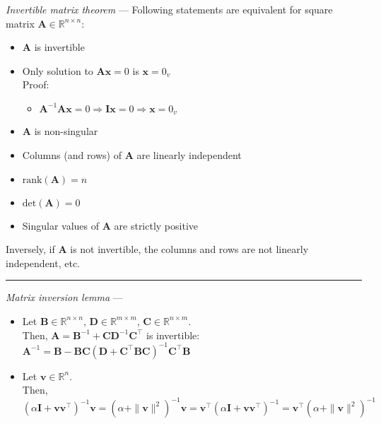 \emph{Invertible matrix theorem} --- Following statements are equivalent for square matrix $\boldsymbol{A} \in \mathbb{R}^{n \times n}$: 
\begin{itemize}
    \item $\boldsymbol{A}$ is invertible
    \item Only solution to $\boldsymbol{A}\boldsymbol{x} = 0$ is $\boldsymbol{x} = 0_v$\\
    Proof:
    \begin{itemize}
        \item $\boldsymbol{A}^{-1} \boldsymbol{A} \boldsymbol{x} = 0 \Rightarrow \boldsymbol{I} \boldsymbol{x} = 0 \Rightarrow \boldsymbol{x} = 0_v$
    \end{itemize}
    \item $\boldsymbol{A}$ is non-singular
    \item Columns (and rows) of $\boldsymbol{A}$ are linearly independent
    \item $\textrm{rank}(\boldsymbol{A}) = n$
    \item $\textrm{det}(\boldsymbol{A}) = 0$
    \item Singular values of $\boldsymbol{A}$ are strictly positive
\end{itemize}
Inversely, if $\boldsymbol{A}$ is not invertible, the columns and rows are not linearly independent, etc. 

{\color{lightgray}\hrule height 0.001mm}

\emph{Matrix inversion lemma} ---
\begin{itemize}
    \item Let $\boldsymbol{B} \in \mathbb{R}^{n \times n}$, $\boldsymbol{D} \in \mathbb{R}^{m \times m}$, $\boldsymbol{C} \in \mathbb{R}^{n \times m}$.\\
    Then, $\boldsymbol{A} = \boldsymbol{B}^{-1} + \boldsymbol{C}\boldsymbol{D}^{-1}\boldsymbol{C}^\intercal$ is invertible: $\boldsymbol{A}^{-1} = \boldsymbol{B} - \boldsymbol{B}\boldsymbol{C} (\boldsymbol{D}+\boldsymbol{C}^\intercal\boldsymbol{B}\boldsymbol{C})^{-1}\boldsymbol{C}^\intercal\boldsymbol{B}$
    \item Let $\boldsymbol{v} \in \mathbb{R}^{n}$.\\
    Then, $(\alpha \boldsymbol{I} + \boldsymbol{v}\boldsymbol{v}^\intercal)^{-1}\boldsymbol{v} = (\alpha + \|\boldsymbol{v}\|^2)^{-1}\boldsymbol{v} = \boldsymbol{v}^\intercal(\alpha \boldsymbol{I} + \boldsymbol{v}\boldsymbol{v}^\intercal)^{-1} = \boldsymbol{v}^\intercal(\alpha + \|\boldsymbol{v}\|^2)^{-1}$
\end{itemize}
 
